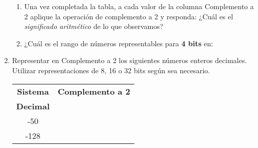 \documentclass[12pt]{article}
\begin{document}
\begin{enumerate}
\begin{center}
        \end{center}

        \begin{enumerate}
                
            \item Una vez completada la tabla, a cada valor de la columna
                Complemento a 2 aplique la operación de complemento a 2 y
                responda: ¿Cuál es el \emph{significado aritmético} de lo que
                observamos?

            \item ¿Cuál es el rango de números representables para \textbf{4
                bits} en:


    \end{enumerate}

    \item Representar en Complemento a 2 los siguientes números enteros
        decimales. Utilizar representaciones de 8, 16 o 32 bits según sea
        necesario.

        \begin{center}

            \begin{tabular}[t]{|c|c|}

            \hline

                \textbf{Sistema} & \textbf{Complemento a 2}\\

                \textbf{Decimal} & ~ \\

            \hline

                -50 & \hspace{27em}~ \\

            \hline

                -128&\\


\end{tabular}
\end{center}
\end{enumerate}
\end{document}
